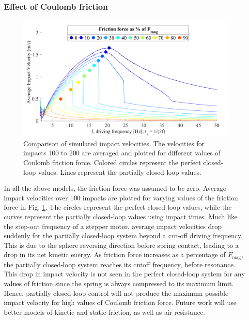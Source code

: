 \documentclass[letterpaper, 10 pt, journal, twoside]{ieeetran}
\begin{document}
\subsubsection{Effect of Coulomb friction}
\label{frictionwriteup}
\begin{figure}
	\includegraphics[width=\linewidth]{FrictionForceWithClosedLoopValues.pdf}
		\caption[Effect of Coulomb friction on partially closed-loop control]{Comparison of  simulated impact velocities. The  velocities for impacts 100 to 200 are averaged and plotted for different values of Coulomb friction force. Colored circles represent the perfect closed-loop values.  Lines represent the partially closed-loop values.}
	\label{friction}
	\vspace{-2em}
\end{figure}
In all the above models, the friction force was assumed to be zero. Average impact velocities over 100 impacts are plotted for varying values of the friction force in Fig. \ref{friction}. The circles represent the perfect closed-loop values, while the curves represent the partially closed-loop values using impact times. Much like the step-out frequency of a stepper motor, average impact velocities drop suddenly for the partially closed-loop system beyond a cut-off driving frequency. This is due to the sphere reversing direction before spring contact, leading to a drop in its net kinetic energy. As friction force increases as a percentage of $F_{\textrm{mag}}$, the partially closed-loop system reaches its cutoff frequency, before resonance. This drop in impact velocity is not seen in the perfect closed-loop system for any values of friction since the spring is always compressed to its maximum limit. Hence, partially closed-loop control will not produce the maximum possible impact velocity for high values of Coulomb friction force. Future work will use better models of kinetic and static friction, as well as air resistance.
\end{document}
